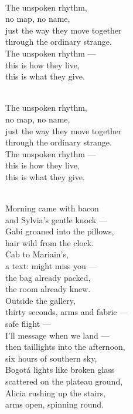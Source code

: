 \begin{lyrics}

\\
The unspoken rhythm,\\
no map, no name,\\
just the way they move together\\
through the ordinary strange.\\
The unspoken rhythm —\\
this is how they live,\\
this is what they give.

\\
The unspoken rhythm,\\
no map, no name,\\
just the way they move together\\
through the ordinary strange.\\
The unspoken rhythm —\\
this is how they live,\\
this is what they give.

\\
Morning came with bacon\\
and Sylvia's gentle knock —\\
Gabi groaned into the pillows,\\
hair wild from the clock.\\
Cab to Mariain's,\\
a text: might miss you —\\
the bag already packed,\\
the room already knew.\\
Outside the gallery,\\
thirty seconds, arms and fabric —\\
safe flight —\\
I'll message when we land —\\
then taillights into the afternoon,\\
six hours of southern sky,\\
Bogotá lights like broken glass\\
scattered on the plateau ground,\\
Alicia rushing up the stairs,\\
arms open, spinning round.


\end{lyrics}
